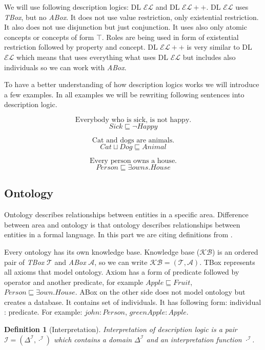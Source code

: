 \documentclass[12pt,a4paper]{article}
\newtheorem{definition}{Definition}[subsection]
\begin{document}
We will use following description logics: DL $\mathcal{EL}$ and DL $\mathcal{EL{+}{+}}$. DL $\mathcal{EL}$  uses \textit{TBox}, but no \textit{ABox}. It does not use value restriction, only existential restriction. It also does not use disjunction but just conjunction. It uses also only atomic concepts or concepts of form $\top$. Roles are being used in form of existential restriction followed by property and concept. DL $\mathcal{EL{+}{+}}$ is very similar to DL $\mathcal{EL}$ which means that uses everything what uses DL $\mathcal{EL}$ but includes also individuals so we can work with \textit{ABox}.

To have a better understanding of how description logics works we will introduce a few examples. In all examples we will be rewriting following sentences into description logic.

\[ \text{Everybody who is sick, is not happy.} \]
\[ Sick \sqsubseteq \neg Happy \]

\[ \text{Cat and dogs are animals.} \]
\[ Cat \sqcup Dog \sqsubseteq Animal \]

\[ \text{Every person owns a house.} \]
\[ Person \sqsubseteq \exists owns.House \]

\subsection{Ontology}
Ontology describes relationships between entities in a specific area. Difference between area and ontology is that ontology describes relationships between entities in a formal language. In this part we are citing definitions from \citep{staabHandbookOntology}.

Every ontology has its own knowledge base. Knowledge base ($\mathcal{KB}$) is an ordered pair of \textit{TBox} $\mathcal{T}$ and \textit{ABox} $\mathcal{A}$, so we can write $\mathcal{KB} = (\mathcal{T}, \mathcal{A})$. TBox represents all axioms that model ontology. Axiom has a form of predicate followed by operator and another predicate, for example $Apple \sqsubseteq Fruit$, $Person \sqsubseteq \exists own.House$. ABox on the other side does not model ontology but creates a database. It contains set of individuals. It has following form: individual : predicate. For example: $john : Person$, $greenApple : Apple$.

\begin{definition}[Interpretation]
	Interpretation of description logic is a pair $\mathcal{I} = (\Delta^{\mathcal{I}}, \cdot ^{\mathcal{I}})$ which contains a domain $\Delta^{\mathcal{I}}$ and an interpretation function $\cdot ^{\mathcal{I}}$.	
\end{definition}
\end{document}
